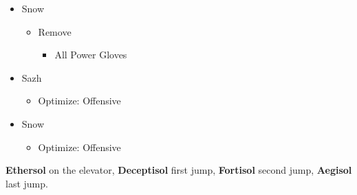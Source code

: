 \begin{menu}
\begin{itemize}
\begin{itemize}
        \item Snow
        \begin{itemize}
            \item Remove
            \begin{itemize}
                \item All Power Gloves
            \end{itemize}
        \end{itemize}
        \item Sazh
        \begin{itemize}
            \item Optimize: Offensive
        \end{itemize}
        \item Snow
        \begin{itemize}
            \item Optimize: Offensive
        \end{itemize}
    \end{itemize}
\end{itemize}
\end{menu}
\textbf{Ethersol} on the elevator, \textbf{Deceptisol} first jump, \textbf{Fortisol} second jump, \textbf{Aegisol} last jump.
\renewcommand{\first}{[1] Tireless Charge (\com/\com/\med)}
\renewcommand{\second}{[2] Cerberus (\com/\com/\com)}
\renewcommand{\third}{[3] Thaumaturgy (\rav/\rav/\med)}
\renewcommand{\fourth}{[4] Relentless Assault (\com/\rav/\rav)}
\renewcommand{\fifth}{[5] Smart Bomb (\rav/\rav/\sab)}
\renewcommand{\sixth}{[6] Tri-Disaster (\rav/\rav/\rav)}
